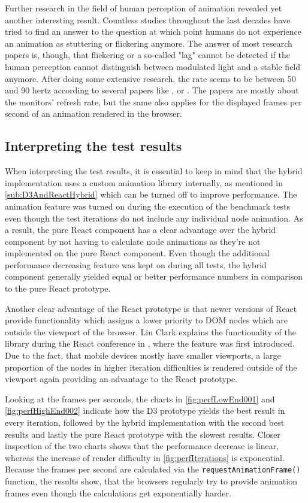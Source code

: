 Further research in the field of human perception of animation revealed yet another interesting result. Countless studies throughout the last decades have tried to find an answer to the question at which point humans do not experience an animation as stuttering or flickering anymore. The answer of most research papers is, though, that flickering or a so-called "lag" cannot be detected if the human perception cannot distinguish between modulated light and a stable field anymore. After doing some extensive research, the rate seems to be between 50 and 90 hertz according to several papers like \cite{6375944}, \cite{farrell1987predicting} or \cite{stereoscopicFlickerArticle}. The papers are mostly about the monitors' refresh rate, but the same also applies for the displayed frames per second of an animation rendered in the browser.

\subsection{Interpreting the test results}

When interpreting the test results, it is essential to keep in mind that the hybrid implementation uses a custom animation library internally, as mentioned in \ref{sub:D3AndReactHybrid} which can be turned off to improve performance. The animation feature was turned on during the execution of the benchmark tests even though the test iterations do not include any individual node animation. As a result, the pure React component has a clear advantage over the hybrid component by not having to calculate node animations as they're not implemented on the pure React component. Even though the additional performance decreasing feature was kept on during all tests, the hybrid component generally yielded equal or better performance numbers in comparison to the pure React prototype.

Another clear advantage of the React prototype is that newer versions of React provide functionality which assigns a lower priority to DOM nodes which are outside the viewport of the browser. Lin Clark explains the functionality of the library during the React conference in \cite{ReactReconcliliationVideo}, where the feature was first introduced. Due to the fact, that mobile devices mostly have smaller viewports, a large proportion of the nodes in higher iteration difficulties is rendered outside of the viewport again providing an advantage to the React prototype.

Looking at the frames per seconds, the charts in \ref{fig:perfLowEnd001} and \ref{fig:perfHighEnd002} indicate how the D3 prototype yields the best result in every iteration, followed by the hybrid implementation with the second best results and lastly the pure React prototype with the slowest results. Closer inspection of the two charts shows that the performance decrease is linear, whereas the increase of render difficulty in \ref{fig:perfIterations} is exponential. Because the frames per second are calculated via the \texttt{requestAnimationFrame()} function, the results show, that the browsers regularly try to provide animation frames even though the calculations get exponentially harder.

